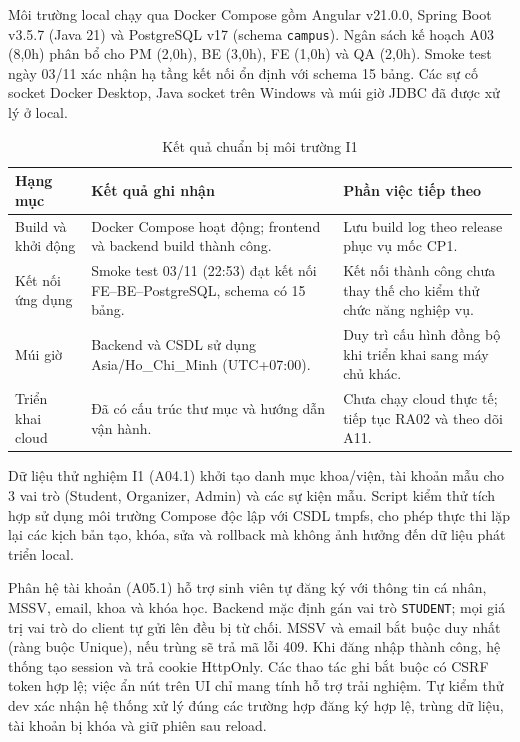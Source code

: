 
Môi trường local chạy qua Docker Compose gồm Angular v21.0.0, Spring Boot v3.5.7 (Java 21) và PostgreSQL v17 (schema \texttt{campus}). Ngân sách kế hoạch A03 (8,0h) phân bổ cho PM (2,0h), BE (3,0h), FE (1,0h) và QA (2,0h). Smoke test ngày 03/11 xác nhận hạ tầng kết nối ổn định với schema 15 bảng. Các sự cố socket Docker Desktop, Java socket trên Windows và múi giờ JDBC đã được xử lý ở local.

\begin{table}[H]
\centering\small
\caption{Kết quả chuẩn bị môi trường I1}\label{tab:i1-env}
\begin{tabularx}{\linewidth}{@{}p{.23\linewidth}XX@{}}
\toprule
\textbf{Hạng mục} & \textbf{Kết quả ghi nhận} & \textbf{Phần việc tiếp theo}\\\midrule
Build và khởi động & Docker Compose hoạt động; frontend và backend build thành công. & Lưu build log theo release phục vụ mốc CP1.\\
Kết nối ứng dụng & Smoke test 03/11 (22:53) đạt kết nối FE--BE--PostgreSQL, schema có 15 bảng. & Kết nối thành công chưa thay thế cho kiểm thử chức năng nghiệp vụ.\\
Múi giờ & Backend và CSDL sử dụng Asia/Ho\_Chi\_Minh (UTC+07:00). & Duy trì cấu hình đồng bộ khi triển khai sang máy chủ khác.\\
Triển khai cloud & Đã có cấu trúc thư mục và hướng dẫn vận hành. & Chưa chạy cloud thực tế; tiếp tục RA02 và theo dõi A11.\\
\bottomrule
\end{tabularx}
\end{table}

Dữ liệu thử nghiệm I1 (A04.1) khởi tạo danh mục khoa/viện, tài khoản mẫu cho 3 vai trò (Student, Organizer, Admin) và các sự kiện mẫu. Script kiểm thử tích hợp sử dụng môi trường Compose độc lập với CSDL tmpfs, cho phép thực thi lặp lại các kịch bản tạo, khóa, sửa và rollback mà không ảnh hưởng đến dữ liệu phát triển local.


Phân hệ tài khoản (A05.1) hỗ trợ sinh viên tự đăng ký với thông tin cá nhân, MSSV, email, khoa và khóa học. Backend mặc định gán vai trò \texttt{STUDENT}; mọi giá trị vai trò do client tự gửi lên đều bị từ chối. MSSV và email bắt buộc duy nhất (ràng buộc Unique), nếu trùng sẽ trả mã lỗi 409. Khi đăng nhập thành công, hệ thống tạo session và trả cookie HttpOnly. Các thao tác ghi bắt buộc có CSRF token hợp lệ; việc ẩn nút trên UI chỉ mang tính hỗ trợ trải nghiệm. Tự kiểm thử dev xác nhận hệ thống xử lý đúng các trường hợp đăng ký hợp lệ, trùng dữ liệu, tài khoản bị khóa và giữ phiên sau reload.


